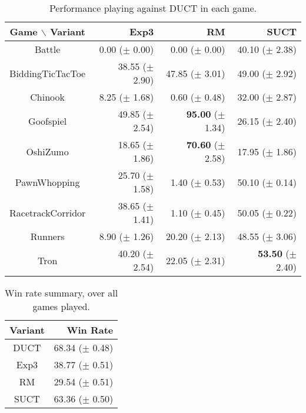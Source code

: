 \documentclass{article}
\begin{document}
\begin{table}
\begin{center}
\begin{tabular}{|c|rrr|}
\hline
 Game $\backslash$ Variant    &  Exp3		 & RM		 & SUCT		\\ 
\hline
		Battle				  & 0.00 ($\pm$ 0.00)        & 0.00 ($\pm$ 0.00)    & 40.10 ($\pm$ 2.38)  \\
         BiddingTicTacToe     & 38.55 ($\pm$ 2.90)      & 47.85 ($\pm$ 3.01)    & 49.00 ($\pm$ 2.92)    \\
                  Chinook     & 8.25 ($\pm$ 1.68)       & 0.60 ($\pm$ 0.48)     & 32.00 ($\pm$ 2.87)    \\
                Goofspiel     & 49.85 ($\pm$ 2.54)      & \textbf{95.00} ($\pm$ 1.34)    & 26.15 ($\pm$ 2.40)    \\
                 OshiZumo     & 18.65 ($\pm$ 1.86)      & \textbf{70.60} ($\pm$ 2.58)    & 17.95 ($\pm$ 1.86)    \\
             PawnWhopping     & 25.70 ($\pm$ 1.58)      & 1.40 ($\pm$ 0.53)     & 50.10 ($\pm$ 0.14)    \\
        RacetrackCorridor     & 38.65 ($\pm$ 1.41)      & 1.10 ($\pm$ 0.45)     & 50.05 ($\pm$ 0.22)    \\
                  Runners     & 8.90 ($\pm$ 1.26)       & 20.20 ($\pm$ 2.13)    & 48.55 ($\pm$ 3.06)    \\
                     Tron     & 40.20 ($\pm$ 2.54)      & 22.05 ($\pm$ 2.31)    & \textbf{53.50} ($\pm$ 2.40)    \\

 
\hline
\end{tabular}
\end{center}
\caption{Performance playing against DUCT in each game. \label{tbl:vsduct}}
\end{table}



\begin{table}
\begin{center}
\begin{tabular}{|c|r|}
\hline
Variant     & Win Rate \\
\hline
      DUCT  &   68.34 ($\pm$ 0.48) \\
      Exp3  &   38.77 ($\pm$ 0.51) \\
        RM  &   29.54 ($\pm$ 0.51) \\
      SUCT  &   63.36 ($\pm$ 0.50) \\

\hline
\end{tabular}
\end{center}
\caption{Win rate summary, over all games played. \label{tbl:summary}}
\end{table}
\end{document}
